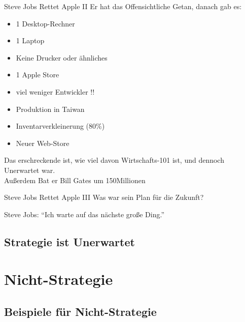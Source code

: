 \documentclass[12pt,compress,ngerman,utf8,t]{beamer}
\begin{document}
\begin{frame}{Steve Jobs Rettet Apple II}
    Er hat das Offensichtliche Getan\pause,
    danach gab es:
    \begin{itemize}
        \item 1 Desktop-Rechner
        \item 1 Laptop
        \item Keine Drucker oder ähnliches
        \item 1 Apple Store
        \item viel weniger Entwickler !!
        \item Produktion in Taiwan
        \item Inventarverkleinerung (80\%)
        \item Neuer Web-Store
    \end{itemize}
    \pause
    Das erschreckende ist, wie viel davon Wirtschafts-101 ist,
    und dennoch Unerwartet war. \\
    \pause
    Außerdem Bat er Bill Gates um 150Millionen
\end{frame}

\begin{frame}[c]{Steve Jobs Rettet Apple III}
    \Large
    Was war sein Plan für die Zukunft? \\
    \pause

    Steve Jobs: ``Ich warte auf das nächste große Ding.''

\end{frame}

\subsection{Strategie ist Unerwartet}




\section{Nicht-Strategie}

\subsection{Beispiele für Nicht-Strategie}
\end{document}
